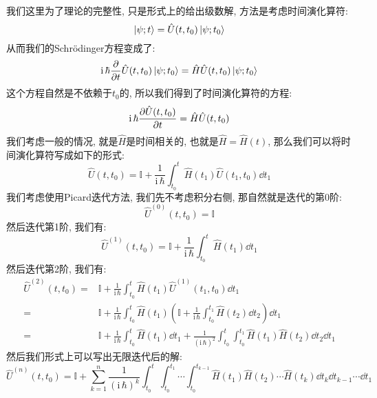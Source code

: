 我们这里为了理论的完整性, 只是形式上的给出级数解, 方法是考虑时间演化算符:
\begin{equation}
  \ket{\psi;t} = \hat{U}(t,t_0) \ket{\psi;t_0}
\end{equation}
从而我们的Schrödinger方程变成了:
\begin{equation}
  \mathrm{i}\, \hbar \pdv{}{t}\hat{U}(t,t_0)\ket{\psi;t_0} = \hat{H} \hat{U}(t,t_0) \ket{\psi;t_0}
\end{equation}
这个方程自然是不依赖于$t_0$的, 所以我们得到了时间演化算符的方程:
\begin{equation}
  \mathrm{i}\, \hbar \pdv{\hat{U}(t,t_0)}{t} = \hat{H} \hat{U}(t,t_0)
\end{equation}
我们考虑一般的情况, 就是$\hat{H}$是时间相关的, 也就是$\hat{H} = \hat{H}(t)$, 那么我们可以将时间演化算符写成如下的形式:
\begin{equation}
  \hat{U}(t,t_0) = \mathbb{I} + \frac{1}{\mathrm{i}\, \hbar} \int_{t_0}^{t} \hat{H}(t_1) \hat{U}(t_1,t_0) \dd{t_1}
\end{equation}
我们考虑使用Picard迭代方法, 我们先不考虑积分右侧, 那自然就是迭代的第0阶:
\begin{equation}
  \hat{U}^{(0)}(t,t_0) = \mathbb{I}
\end{equation}
然后迭代第1阶, 我们有:
\begin{equation}
  \hat{U}^{(1)}(t,t_0) = \mathbb{I} + \frac{1}{\mathrm{i}\, \hbar} \int_{t_0}^{t} \hat{H}(t_1) \dd{t_1}
\end{equation}
然后迭代第2阶, 我们有:
\begin{align}
  \hat{U}^{(2)}(t,t_0) =& \mathbb{I} + \frac{1}{\mathrm{i}\, \hbar} \int_{t_0}^{t} \hat{H}(t_1) \hat{U}^{(1)}(t_1,t_0) \dd{t_1} \\
  =& \mathbb{I} + \frac{1}{\mathrm{i}\, \hbar} \int_{t_0}^{t} \hat{H}(t_1) \left( \mathbb{I} + \frac{1}{\mathrm{i}\, \hbar} \int_{t_0}^{t_1} \hat{H}(t_2) \dd{t_2} \right) \dd{t_1} \\
  =& \mathbb{I} + \frac{1}{\mathrm{i}\, \hbar} \int_{t_0}^{t} \hat{H}(t_1) \dd{t_1} + \frac{1}{(\mathrm{i}\, \hbar)^2} \int_{t_0}^{t} \int_{t_0}^{t_1} \hat{H}(t_1) \hat{H}(t_2) \dd{t_2} \dd{t_1}
\end{align}
然后我们形式上可以写出无限迭代后的解:
\begin{equation}
  \hat{U}^{(n)}(t,t_0) = \mathbb{I} + \sum_{k=1}^{n} \frac{1}{(\mathrm{i}\, \hbar)^k} \int_{t_0}^{t} \int_{t_0}^{t_1} \cdots \int_{t_0}^{t_{k-1}} \hat{H}(t_1) \hat{H}(t_2) \cdots \hat{H}(t_k) \dd{t_k} \dd{t_{k-1}} \cdots \dd{t_1}
\end{equation}
